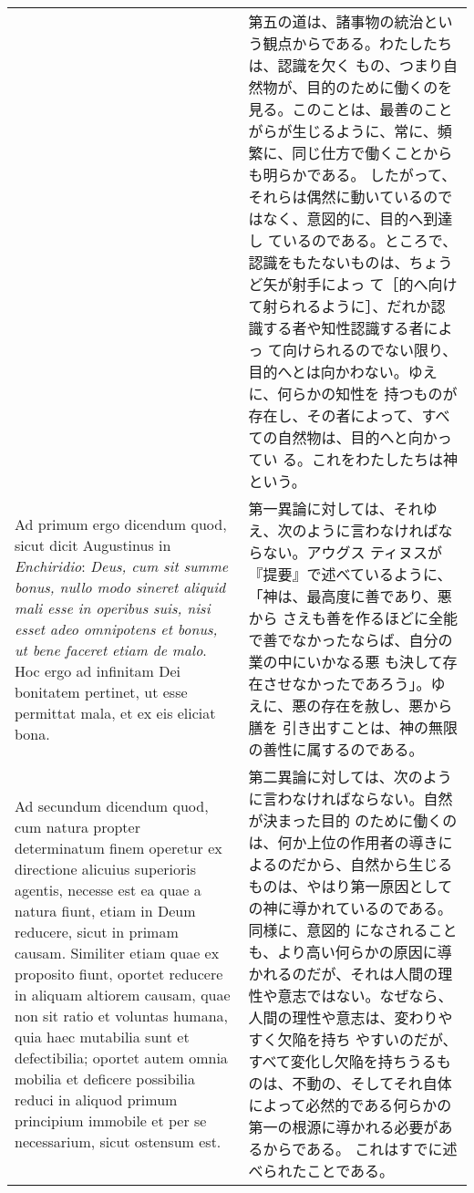 \documentclass[10pt]{jsarticle}
\begin{document}
\begin{longtable}{p{21em}p{21em}}
&

第五の道は、諸事物の統治という観点からである。わたしたちは、認識を欠く
もの、つまり自然物が、目的のために働くのを見る。このことは、最善のこと
がらが生じるように、常に、頻繁に、同じ仕方で働くことからも明らかである。
したがって、それらは偶然に動いているのではなく、意図的に、目的へ到達し
ているのである。ところで、認識をもたないものは、ちょうど矢が射手によっ
て［的へ向けて射られるように］、だれか認識する者や知性認識する者によっ
て向けられるのでない限り、目的へとは向かわない。ゆえに、何らかの知性を
持つものが存在し、その者によって、すべての自然物は、目的へと向かってい
る。これをわたしたちは神という。

\\

{\sc Ad primum ergo dicendum} quod, sicut dicit Augustinus in {\it
Enchiridio}: {\it Deus, cum sit summe bonus, nullo modo sineret
aliquid mali esse in operibus suis, nisi esset adeo omnipotens et
bonus, ut bene faceret etiam de malo}. Hoc ergo ad infinitam Dei
bonitatem pertinet, ut esse permittat mala, et ex eis eliciat bona.

&

第一異論に対しては、それゆえ、次のように言わなければならない。アウグス
ティヌスが『提要』で述べているように、「神は、最高度に善であり、悪から
さえも善を作るほどに全能で善でなかったならば、自分の業の中にいかなる悪
も決して存在させなかったであろう」。ゆえに、悪の存在を赦し、悪から膳を
引き出すことは、神の無限の善性に属するのである。

\\

{\sc Ad secundum dicendum} quod, cum natura propter determinatum finem
operetur ex directione alicuius superioris agentis, necesse est ea
quae a natura fiunt, etiam in Deum reducere, sicut in primam
causam. Similiter etiam quae ex proposito fiunt, oportet reducere in
aliquam altiorem causam, quae non sit ratio et voluntas humana, quia
haec mutabilia sunt et defectibilia; oportet autem omnia mobilia et
deficere possibilia reduci in aliquod primum principium immobile et
per se necessarium, sicut ostensum est.

&

第二異論に対しては、次のように言わなければならない。自然が決まった目的
のために働くのは、何か上位の作用者の導きによるのだから、自然から生じる
ものは、やはり第一原因としての神に導かれているのである。同様に、意図的
になされることも、より高い何らかの原因に導かれるのだが、それは人間の理
性や意志ではない。なぜなら、人間の理性や意志は、変わりやすく欠陥を持ち
やすいのだが、すべて変化し欠陥を持ちうるものは、不動の、そしてそれ自体
によって必然的である何らかの第一の根源に導かれる必要があるからである。
これはすでに述べられたことである。

\end{longtable}
\end{document}

